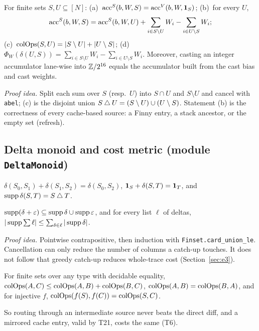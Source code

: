 \begin{theorem}\label{thm:t3}
For finite sets $S,U\subseteq[N]$:
(a)~$\mathrm{acc}^{S}(b,W,S)=\mathrm{acc}^{V}(b,W,\mathbf{1}_S)$;
(b)~for every $U$,
\[\mathrm{acc}^{S}(b,W,S)=\mathrm{acc}^{S}(b,W,U)+\sum_{i\in S\setminus U}W_i-\sum_{i\in U\setminus S}W_i;\]
(c)~$\operatorname{colOps}(S,U)=|S\setminus U|+|U\setminus S|$;
(d)~$\Phi_W(\delta(U,S))=\sum_{i\in S\setminus U}W_i-\sum_{i\in U\setminus S}W_i$.
Moreover, casting an integer accumulator lane-wise into $\mathbb{Z}/2^{16}$ equals the accumulator built from the cast bias and cast weights.
\end{theorem}
\noindent\emph{Proof idea.} Split each sum over $S$ (resp.\ $U$) into $S\cap U$ and $S\setminus U$ and cancel with \texttt{abel}; (c) is the disjoint union $S\mathbin{\triangle} U=(S\setminus U)\cup(U\setminus S)$.
Statement (b) is the correctness of every cache-based source: a Finny entry, a stack ancestor, or the empty set (refresh).

\subsection{Delta monoid and cost metric (module \texttt{DeltaMonoid})}

\begin{theorem}[T4: telescoping]\label{thm:t4}
$\delta(S_0,S_1)+\delta(S_1,S_2)=\delta(S_0,S_2)$, $\mathbf{1}_S+\delta(S,T)=\mathbf{1}_T$, and $\operatorname{supp}\delta(S,T)=S\mathbin{\triangle} T$.
\end{theorem}

\begin{theorem}\label{thm:t5}
$\operatorname{supp}(\delta+\varepsilon)\subseteq\operatorname{supp}\delta\cup\operatorname{supp}\varepsilon$, and for every list $\ell$ of deltas, $|\operatorname{supp}\textstyle\sum\ell|\le\sum_{\delta\in\ell}|\operatorname{supp}\delta|$.
\end{theorem}
\noindent\emph{Proof idea.} Pointwise contrapositive, then induction with \texttt{Finset.card\_union\_le}.
Cancellation can only reduce the number of columns a catch-up touches. It does not follow that greedy catch-up reduces whole-trace cost (Section~\ref{sec:e3}).

\begin{theorem}\label{thm:t6}
For finite sets over any type with decidable equality,
$\operatorname{colOps}(A,C)\le\operatorname{colOps}(A,B)+\operatorname{colOps}(B,C)$, $\operatorname{colOps}(A,B)=\operatorname{colOps}(B,A)$, and for injective $f$, $\operatorname{colOps}(f(S),f(C))=\operatorname{colOps}(S,C)$.
\end{theorem}
\noindent So routing through an intermediate source never beats the direct diff, and a mirrored cache entry, valid by T21, costs the same (T6).

